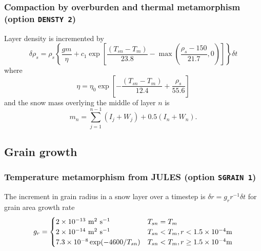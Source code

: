 \documentclass[fleqn]{article}
\begin{document}
\subsubsection{Compaction by overburden and thermal metamorphism (option {\tt DENSTY 2})}

Layer density is incremented by
\begin{equation}
\delta\rho_s = \rho_s\left\{\frac{gm}{\eta} + c_1 \exp\left[\frac{(T_{sn} - T_m)}{23.8} 
                                  - \max\left(\frac{\rho_s - 150}{21.7}, 0\right)\right]\right\}\delta t
\end{equation}
where
\begin{equation}
\eta = \eta_0\exp\left[-\frac{(T_{sn} - T_m)}{12.4} + \frac{\rho_s}{55.6}\right]
\end{equation}
and the snow mass overlying the middle of layer $n$ is
\begin{equation}
m_n = \sum_{j=1}^{n-1}(I_j + W_j) + 0.5(I_n + W_n).
\end{equation}

\subsection{Grain growth}

\subsubsection{Temperature metamorphism from JULES (option {\tt SGRAIN 1})}
The increment in grain radius in a snow layer over a timestep is $\delta r = g_r r^{-1}\delta t$ for grain area growth rate
\begin{equation}
g_r = 
\begin{cases}
    2\times10^{-13}\ {\rm m^2\ s^{-1}}  & T_{sn} = T_m \\
    2\times10^{-14}\ {\rm m^2\ s^{-1}}  & T_{sn} < T_m,r < 1.5 \times 10^{-4}{\rm m} \\
    7.3\times10^{-8} \exp(-4600/T_{sn}) & T_{sn} < T_m,r \geq 1.5 \times 10^{-4}{\rm m} \\
\end{cases}
\end{equation}
\end{document}
